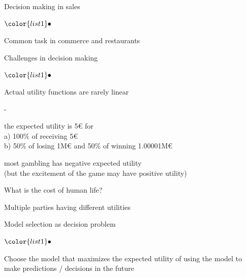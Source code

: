 \documentclass[t]{beamer}
\newenvironment{list1}{
   \begin{list}{$\color{list1}\bullet$}{\itemsep=6pt}}{
  \end{list}}
\newenvironment{list2}{
  \begin{list}{-}{\baselineskip=12pt\itemsep=2pt}}{
  \end{list}}
\begin{document}
\begin{frame}{Decision making in sales}

  \begin{list1}
    \item Common task in commerce and restaurants
  \end{list1}
  
\end{frame}  


\begin{frame}{Challenges in decision making}

  \begin{list1}
  \item Actual utility functions are rarely linear
    \begin{list2}
    \item<2-> the expected utility is 5€ for\\
      a) 100\% of receiving 5€\\
      b) 50\% of losing 1M€ and 50\% of winning 1.00001M€
    \item<3-> most gambling has negative expected utility\\
      (but the excitement of the game may have positive utility)
    \end{list2}
  \item<4-> What is the cost of human life?
  \item<5-> Multiple parties having different utilities
  \end{list1}
  
\end{frame}

\begin{frame}
  
  {\Large\color{navyblue} Model selection as decision problem}

  \begin{list1}
  \item Choose the model that maximizes the expected utility of using
    the model to make predictions / decisions in the future
  \end{list1}

\end{frame}
\end{document}
